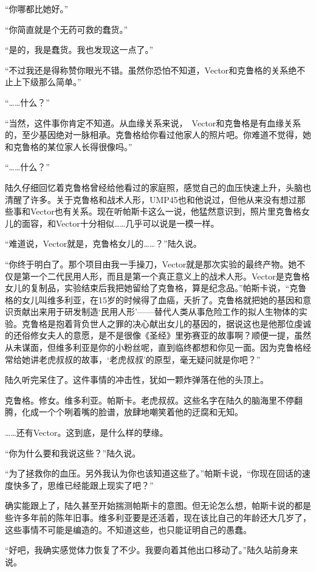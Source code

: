 “你哪都比她好。”

“你简直就是个无药可救的蠢货。”

“是的，我是蠢货。我也发现这一点了。”

“不过我还是得称赞你眼光不错。虽然你恐怕不知道，Vector和克鲁格的关系绝不止上下级那么简单。”

“……什么？”

“当然，这件事你肯定不知道。从血缘关系来说， Vector和克鲁格是有血缘关系的，至少基因绝对一脉相承。克鲁格给你看过他家人的照片吧。你难道不觉得，她和克鲁格的某位家人长得很像吗。”

“……什么？”

陆久仔细回忆着克鲁格曾经给他看过的家庭照，感觉自己的血压快速上升，头脑也清醒了许多。关于克鲁格和战术人形，UMP45也和他说过，但他从来没有想过那些事和Vector也有关系。现在听帕斯卡这么一说，他猛然意识到，照片里克鲁格女儿的面容，和Vector十分相似……几乎可以说是一模一样。

“难道说，Vector就是，克鲁格女儿的……？”陆久说。

“你终于明白了。那个项目由我一手操刀，Vector就是那次实验的最终产物。她不仅是第一个二代民用人形，而且是第一个真正意义上的战术人形。Vector是克鲁格女儿的复制品，实验结束后我把她留给了克鲁格，算是纪念品。”帕斯卡说，“克鲁格的女儿叫维多利亚，在15岁的时候得了血癌，夭折了。克鲁格就把她的基因和意识贡献出来用于研发制造‘民用人形’——替代人类从事危险工作的拟人生物体的实验。克鲁格是抱着背负世人之罪的决心献出女儿的基因的，据说这也是他那位虔诚的还俗修女夫人的意愿，是不是很像《圣经》里弥赛亚的故事啊？顺便一提，虽然从未谋面，但维多利亚是你的小粉丝呢，直到临终都想和你见一面。因为克鲁格经常给她讲老虎叔叔的故事，‘老虎叔叔’的原型，毫无疑问就是你吧？”

陆久听完呆住了。这件事情的冲击性，犹如一颗炸弹落在他的头顶上。

克鲁格。修女。维多利亚。帕斯卡。老虎叔叔。这些名字在陆久的脑海里不停翻腾，化成一个个咧着嘴的脸谱，放肆地嘲笑着他的迂腐和无知。

……还有Vector。这到底，是什么样的孽缘。

“你为什么要和我说这些？”陆久说。

“为了拯救你的血压。另外我认为你也该知道这些了。”帕斯卡说，“你现在回话的速度快多了，思维已经能跟上现实了吧？”

确实能跟上了，陆久甚至开始揣测帕斯卡的意图。但无论怎么想，帕斯卡说的都是些许多年前的陈年旧事。维多利亚要是还活着，现在该比自己的年龄还大几岁了，这些事情不可能是编造的。不知道这些，也只能证明自己的愚蠢。

“好吧，我确实感觉体力恢复了不少。我要向着其他出口移动了。”陆久站前身来说。


